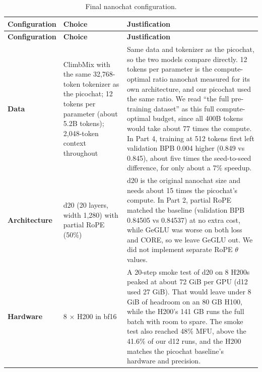 \documentclass[11pt]{article}
\begin{document}
{\small
\renewcommand{\arraystretch}{1.3}
\begin{longtable}{L{2.6cm} L{4.0cm} L{7.8cm}}
\caption{Final nanochat configuration.}\label{tab:final-config}\\
\toprule
\textbf{Configuration} & \textbf{Choice} & \textbf{Justification} \\
\midrule
\endfirsthead

\toprule
\textbf{Configuration} & \textbf{Choice} & \textbf{Justification} \\
\midrule
\endhead

\bottomrule
\endfoot

\textbf{Data} &
ClimbMix with the same 32,768-token tokenizer as the picochat; 12 tokens per parameter (about 5.2B tokens); 2,048-token context throughout &
Same data and tokenizer as the picochat, so the two models compare directly. 12 tokens per parameter is the compute-optimal ratio nanochat measured for its own architecture, and our picochat used the same ratio. We read ``the full pre-training dataset'' as this full compute-optimal budget, since all 400B tokens would take about 77 times the compute. In Part 4, training at 512 tokens first left validation BPB 0.004 higher (0.849 vs 0.845), about five times the seed-to-seed difference, for only about a 7\% speedup. \\
\midrule

\textbf{Architecture} &
d20 (20 layers, width 1,280) with partial RoPE (50\%) &
d20 is the original nanochat size and needs about 15 times the picochat's compute. In Part 2, partial RoPE matched the baseline (validation BPB 0.84505 vs 0.84537) at no extra cost, while GeGLU was worse on both loss and CORE, so we leave GeGLU out. We did not implement separate RoPE $\theta$ values. \\
\midrule

\textbf{Hardware} &
8 $\times$ H200 in bf16 &
A 20-step smoke test of d20 on 8 H200s peaked at about 72 GiB per GPU (d12 used 27 GiB). That would leave under 8 GiB of headroom on an 80 GB H100, while the H200's 141 GB runs the full batch with room to spare. The smoke test also reached 48\% MFU, above the 41.6\% of our d12 runs, and the H200 matches the picochat baseline's hardware and precision. \\

\end{longtable}
}
\end{document}
